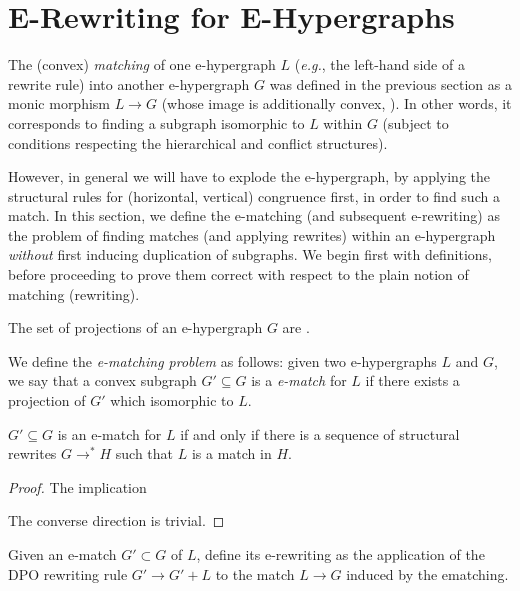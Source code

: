 
\section{E-Rewriting for E-Hypergraphs}

The (convex) \textit{matching} of one e-hypergraph $L$ (\textit{e.g.}, the left-hand side of a rewrite rule) into another e-hypergraph $G$ was defined in the previous section as a monic morphism $L \to G$ (whose image is additionally convex, ). In other words, it corresponds to finding a subgraph isomorphic to $L$ within $G$ (subject to conditions respecting the hierarchical and conflict structures). 


However, in general we will have to explode the e-hypergraph, by applying the structural rules for (horizontal, vertical) congruence first, in order to find such a match. In this section, we define the  e-matching (and subsequent e-rewriting) as the problem of finding matches (and applying rewrites) within an e-hypergraph \textit{without} first inducing duplication of subgraphs. We begin first with definitions, before proceeding to prove them correct with respect to the plain notion of matching (rewriting). 

\begin{definition}[Projection]
The set of projections of an e-hypergraph $G$ are .    
\end{definition}

\begin{definition}[E-matching]
We define the \textit{e-matching problem} as follows: given two e-hypergraphs  $L$ and $G$, we say that a convex subgraph $G' \subseteq G$ is a \textit{e-match} for $L$ if there exists a projection of $G'$ which isomorphic to $L$.
\end{definition}

\begin{lemma}
$G' \subseteq G$ is an e-match for $L$ if and only if there is a sequence of structural rewrites $G \to^* H$ such that $L$ is a match in $H$.
\end{lemma}
\begin{proof}
The implication

The converse direction is trivial. 
\end{proof}

\begin{definition}[E-matching]
Given an e-match $G' \subset G$ of $L$, 
define its e-rewriting as the application of the DPO rewriting rule $G' \to G' + L$  to the match $L \to G$ induced by the ematching. 
\end{definition}


